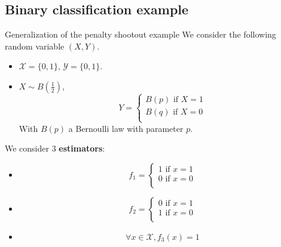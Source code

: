 \documentclass[usenames,dvipsnames]{beamer}
\begin{document}
\subsection{Binary classification example}

\begin{frame}{Generalization of the penalty shootout example}
    We consider the following random variable $(X,Y)$.
    \begin{itemize}
	\item $ \mathcal{X} = \{0, 1\}$, $ \mathcal{Y}  = \{0, 1\}$.
        \item 
            $ X\sim B( \frac{1}{2} )$, 
         $$
            Y = \left\{
                \begin{array}{ll}
                    B(p) \text{ if } X=1   \\
                    B(q) \text{ if } X=0   \\
                \end{array}
                \right.
                $$
    With $B(p)$ a Bernoulli law with parameter $p$.
    \end{itemize}
\end{frame}

\begin{frame}{}
    We consider $3$ \textbf{estimators}:
    \begin{itemize}
    	\item 
         $$
            f_1 = \left\{
                \begin{array}{ll}
                    1 \text{ if } x=1   \\
                    0 \text{ if } x=0   \\
                \end{array}
                \right.
                $$
    	\item 
         $$
            f_2 = \left\{
                \begin{array}{ll}
                    0 \text{ if } x=1   \\
                    1 \text{ if } x=0   \\
                \end{array}
                \right.
                $$
	\item 

	    \begin{equation}
		\forall x\in \mathcal{X}, f_3(x)=1
	    \end{equation}
    \end{itemize}
\end{frame}
\end{document}
